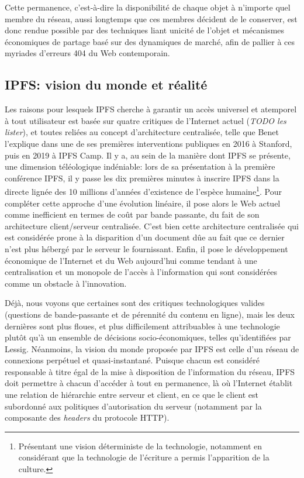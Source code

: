 \documentclass{article}
\begin{document}
Cette permanence, c'est-à-dire la disponibilité de chaque objet à n'importe quel membre du réseau, aussi longtemps que ces membres décident de le conserver, est donc rendue possible par des techniques liant unicité de l'objet et mécanismes économiques de partage basé sur des dynamiques de marché, afin de pallier à ces myriades d'erreurs 404 du Web contemporain.

\subsection{IPFS: vision du monde et réalité}

Les raisons pour lesquels IPFS cherche à garantir un accès universel et atemporel à tout utilisateur est basée sur quatre critiques de l'Internet actuel (\emph{TODO les lister}), et toutes reliées au concept d'architecture centralisée, telle que Benet l'explique dans une de ses premières interventions publiques en 2016 à Stanford\cite{stanfordonline_stanford_2015}, puis en 2019 à IPFS Camp\cite{benet_ipfs_2014}. Il y a, au sein de la manière dont IPFS se présente, une dimension téléologique indéniable: lors de sa présentation à la première conférence IPFS, il y passe les dix premières minutes à inscrire IPFS dans la directe lignée des 10 millions d'années d'existence de l'espèce humaine\footnote{Présentant une vision déterministe de la technologie, notamment en considérant que la technologie de l'écriture a permis l'apparition de la culture.}. Pour compléter cette approche d'une évolution linéaire, il pose alors le Web actuel comme inefficient en termes de coût par bande passante, du fait de son architecture client/serveur centralisée. C'est bien cette architecture centralisée qui est considérée prone à la disparition d'un document dûe au fait que ce dernier n'est plus hébergé par le serveur le fournissant. Enfin, il pose le développement économique de l'Internet et du Web aujourd'hui comme tendant à une centralisation et un monopole de l'accès à l'information qui sont considérées comme un obstacle à l'innovation.

Déjà, nous voyons que certaines sont des critiques technologiques valides (questions de bande-passante et de pérennité du contenu en ligne), mais les deux dernières sont plus floues, et plus difficilement attribuables à une technologie plutôt qu'à un ensemble de décisions socio-économiques, telles qu'identifiées par Lessig. Néanmoins, la vision du monde proposée par IPFS est celle d'un réseau de connexions perpétuel et quasi-instantané. Puisque chacun est considéré responsable à titre égal de la mise à disposition de l'information du réseau, IPFS doit permettre à chacun d'accéder à tout en permanence, là où l'Internet établit une relation de hiérarchie entre serveur et client, en ce que le client est subordonné aux politiques d'autorisation du serveur (notamment par la composante des \emph{headers} du protocole HTTP).
\end{document}
